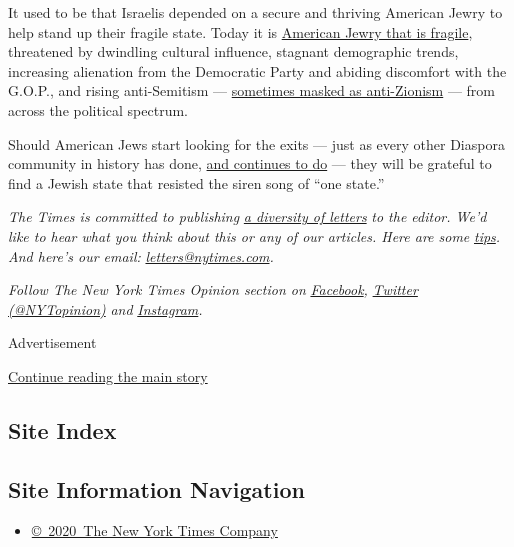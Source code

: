 It used to be that Israelis depended on a secure and thriving American
Jewry to help stand up their fragile state. Today it is
\href{https://www.tabletmag.com/sections/arts-letters/articles/the-collapse}{American
Jewry that is fragile}, threatened by dwindling cultural influence,
stagnant demographic trends, increasing alienation from the Democratic
Party and abiding discomfort with the G.O.P., and rising anti-Semitism
---
\href{https://www.nytimes.com/2019/02/08/opinion/sunday/israel-progressive-anti-semitism.html}{sometimes
masked as anti-Zionism} --- from across the political spectrum.

Should American Jews start looking for the exits --- just as every other
Diaspora community in history has done,
\href{https://www.nationalgeographic.com/history/2019/11/french-jews-fleeing-country/}{and
continues to do} --- they will be grateful to find a Jewish state that
resisted the siren song of ``one state.''

\emph{The Times is committed to publishing}
\href{https://www.nytimes.com/2019/01/31/opinion/letters/letters-to-editor-new-york-times-women.html}{\emph{a
diversity of letters}} \emph{to the editor. We'd like to hear what you
think about this or any of our articles. Here are some}
\href{https://help.nytimes.com/hc/en-us/articles/115014925288-How-to-submit-a-letter-to-the-editor}{\emph{tips}}\emph{.
And here's our email:}
\href{mailto:letters@nytimes.com}{\emph{letters@nytimes.com}}\emph{.}

\emph{Follow The New York Times Opinion section on}
\href{https://www.facebook.com/nytopinion}{\emph{Facebook}}\emph{,}
\href{http://twitter.com/NYTOpinion}{\emph{Twitter (@NYTopinion)}}
\emph{and}
\href{https://www.instagram.com/nytopinion/}{\emph{Instagram}}\emph{.}

Advertisement

\protect\hyperlink{after-bottom}{Continue reading the main story}

\hypertarget{site-index}{%
\subsection{Site Index}\label{site-index}}

\hypertarget{site-information-navigation}{%
\subsection{Site Information
Navigation}\label{site-information-navigation}}

\begin{itemize}
\tightlist
\item
  \href{https://help.nytimes.com/hc/en-us/articles/115014792127-Copyright-notice}{©~2020~The
  New York Times Company}
\end{itemize}

